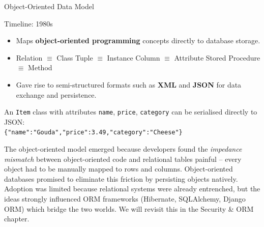 \begin{frame}{Object-Oriented Data Model}
  \begin{block}{Timeline: 1980s}
    \begin{itemize}
      \item Maps \textbf{object-oriented programming} concepts directly to
            database storage.
      \item Relation $\equiv$ Class \quad Tuple $\equiv$ Instance \quad
            Column $\equiv$ Attribute \quad Stored Procedure $\equiv$ Method
      \item Gave rise to semi-structured formats such as \textbf{XML} and
            \textbf{JSON} for data exchange and persistence.
    \end{itemize}
  \end{block}

  \begin{examples}{}
    An \texttt{Item} class with attributes \texttt{name}, \texttt{price},
    \texttt{category} can be serialised directly to JSON:\\[2pt]
    \texttt{\{"name":"Gouda","price":3.49,"category":"Cheese"\}}
  \end{examples}

  The object-oriented model emerged because developers found the
  \emph{impedance mismatch} between object-oriented code and relational tables
  painful -- every object had to be manually mapped to rows and columns.
  Object-oriented databases promised to eliminate this friction by persisting
  objects natively.  Adoption was limited because relational systems were
  already entrenched, but the ideas strongly influenced ORM frameworks
  (Hibernate, SQLAlchemy, Django ORM) which bridge the two worlds.
  We will revisit this in the Security \& ORM chapter.
\end{frame}

